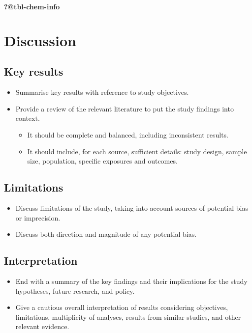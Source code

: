 \documentclass[
  letterpaper,
  DIV=11,
  numbers=noendperiod]{scrartcl}
\providecommand{\tightlist}{%
  \setlength{\itemsep}{0pt}\setlength{\parskip}{0pt}}\usepackage{longtable,booktabs,array}
\begin{document}
\textbf{?@tbl-chem-info}

\hypertarget{sec-discussion}{%
\section{Discussion}\label{sec-discussion}}

\hypertarget{sec-disc-res-key}{%
\subsection{Key results}\label{sec-disc-res-key}}

\begin{itemize}
\tightlist
\item
  Summarise key results with reference to study objectives.
\item
  Provide a review of the relevant literature to put the study findings
  into context.

  \begin{itemize}
  \tightlist
  \item
    It should be complete and balanced, including inconsistent results.
  \item
    It should include, for each source, sufficient details: study
    design, sample size, population, specific exposures and outcomes.
  \end{itemize}
\end{itemize}

\hypertarget{sec-limitations}{%
\subsection{Limitations}\label{sec-limitations}}

\begin{itemize}
\tightlist
\item
  Discuss limitations of the study, taking into account sources of
  potential bias or imprecision.
\item
  Discuss both direction and magnitude of any potential bias.
\end{itemize}

\hypertarget{sec-interpretation}{%
\subsection{Interpretation}\label{sec-interpretation}}

\begin{itemize}
\tightlist
\item
  End with a summary of the key findings and their implications for the
  study hypotheses, future research, and policy.
\item
  Give a cautious overall interpretation of results considering
  objectives, limitations, multiplicity of analyses, results from
  similar studies, and other relevant evidence.
\end{itemize}
\end{document}
